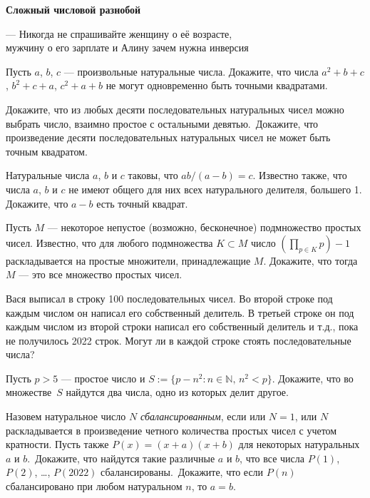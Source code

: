 \centerline{\bf \Huge Сложный числовой разнобой}

\begin{flushright}
        \scriptsize{--- Никогда не спрашивайте женщину о её возрасте,\\ мужчину о его зарплате и Алину зачем нужна инверсия}
\end{flushright}

Пусть $a$, $b$, $c$ — произвольные натуральные числа. Докажите, что числа $a^2+b+c$, $b^2+c+a$, $c^2+a+b$ не могут одновременно быть точными квадратами.

Докажите, что из любых десяти последовательных натуральных чисел можно выбрать число, взаимно простое с остальными девятью.\ Докажите, что произведение десяти последовательных натуральных чисел не может быть точным квадратом.

Натуральные числа $a$, $b$ и $c$ таковы, что $ab/(a-b)=c$. Известно также, что числа $a$, $b$ и $c$ не имеют общего для них всех натурального делителя, большего 1. Докажите, что $a-b$ есть точный квадрат.

Пусть $M$ — некоторое непустое (возможно, бесконечное) подмножество простых чисел. Известно, что для любого подмножества $K\subset M$ число $(\prod_{p\in K} p )- 1$ раскладывается на простые множители, принадлежащие $M$. Докажите, что тогда $M$ — это все множество простых чисел.

Вася выписал в строку 100 последовательных чисел. Во второй строке под каждым числом он написал его собственный делитель. В третьей строке он под каждым числом из второй строки написал его собственный делитель и т.д., пока не получилось 2022 строк. Могут ли в каждой строке стоять последовательные числа?

Пусть $p > 5$ — простое число и $S:=\{p - n^2 \colon n \in \mathbb{N}, \, n^2 < p\}$. Докажите, что во множестве $S$ найдутся два числа, одно из которых делит другое.

Назовем натуральное число $N$ \textit{сбалансированным}, если или $N=1$, или $N$ раскладывается в произведение четного количества простых чисел с учетом кратности. Пусть также $P(x)=(x+a)(x+b)$ для некоторых натуральных $a$ и $b$.\ Докажите, что найдутся такие различные $a$ и $b$, что все числа $P(1)$, $P(2)$, …, $P(2022)$ сбалансированы.\ Докажите, что если $P(n)$ сбалансировано при любом натуральном $n$, то $a = b$.

\newpage

\hspace{3mm}

